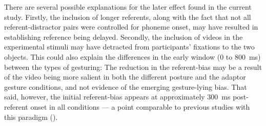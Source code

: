 \documentclass[a4paper,man,natbib]{apa6}
\begin{document}
There are several possible explanations for the later effect found in the current study.
Firstly, the inclusion of longer referents, along with the fact that not all referent-distractor pairs were controlled for phoneme onset, may have resulted in establishing reference being delayed. %
Secondly, the inclusion of videos in the experimental stimuli may have detracted from participants' fixations to the two objects. %
This could also explain the differences in the early window (0 to 800~ms) between the types of gesturing: The reduction in the referent-bias may be a result of the video being more salient in both the different posture and the adaptor gesture conditions, and not evidence of the emerging gesture-lying bias. %
That said, however, the initial referent-bias appears at approximately 300~ms post-referent onset in all conditions --- a point comparable to previous studies with this paradigm (\citealt{Loy2017, King2018}).
\end{document}
